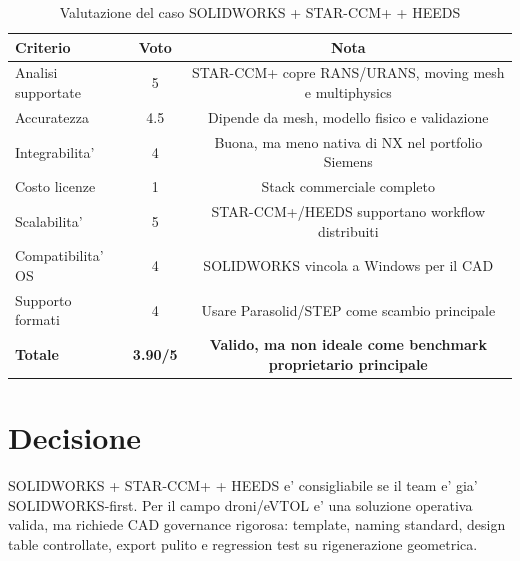 \begin{table}[H]
\centering
\caption{Valutazione del caso SOLIDWORKS + STAR-CCM+ + HEEDS}
\begin{tabular}{P{5cm} c c}
\toprule
\textbf{Criterio} & \textbf{Voto} & \textbf{Nota} \\
\midrule
Analisi supportate & 5 & STAR-CCM+ copre RANS/URANS, moving mesh e multiphysics \\
Accuratezza & 4.5 & Dipende da mesh, modello fisico e validazione \\
Integrabilita' & 4 & Buona, ma meno nativa di NX nel portfolio Siemens \\
Costo licenze & 1 & Stack commerciale completo \\
Scalabilita' & 5 & STAR-CCM+/HEEDS supportano workflow distribuiti \\
Compatibilita' OS & 4 & SOLIDWORKS vincola a Windows per il CAD \\
Supporto formati & 4 & Usare Parasolid/STEP come scambio principale \\
\midrule
\textbf{Totale} & \textbf{3.90/5} & \textbf{Valido, ma non ideale come benchmark proprietario principale} \\
\bottomrule
\end{tabular}
\end{table}

\section{Decisione}

SOLIDWORKS + STAR-CCM+ + HEEDS e' consigliabile se il team e' gia' SOLIDWORKS-first. Per il campo droni/eVTOL e' una soluzione operativa valida, ma richiede CAD governance rigorosa: template, naming standard, design table controllate, export pulito e regression test su rigenerazione geometrica.
